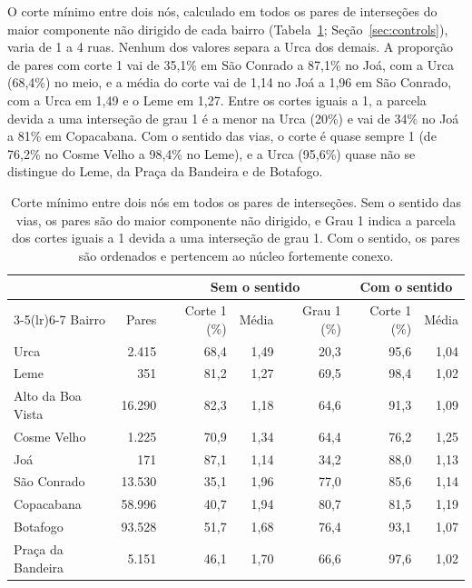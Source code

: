 O corte mínimo entre dois nós, calculado em todos os pares de interseções do
maior componente não dirigido de cada bairro (Tabela~\ref{tab:corte};
Seção~\ref{sec:controls}), varia de 1 a 4 ruas. Nenhum dos valores separa a
Urca dos demais. A proporção de pares com corte 1 vai de 35,1\% em São Conrado
a 87,1\% no Joá, com a Urca (68,4\%) no meio, e a média do corte vai de 1,14 no
Joá a 1,96 em São Conrado, com a Urca em 1,49 e o Leme em 1,27. Entre os cortes
iguais a 1, a parcela devida a uma interseção de grau 1 é a menor na Urca
(20\%) e vai de 34\% no Joá a 81\% em Copacabana. Com o sentido das vias, o
corte é quase sempre 1 (de 76,2\% no Cosme Velho a 98,4\% no Leme), e a Urca
(95,6\%) quase não se distingue do Leme, da Praça da Bandeira e de Botafogo.

\begin{table}[tbp]
\centering
\caption{Corte mínimo entre dois nós em todos os pares de interseções. Sem o
sentido das vias, os pares são do maior componente não dirigido, e Grau 1
indica a parcela dos cortes iguais a 1 devida a uma interseção de grau 1. Com o
sentido, os pares são ordenados e pertencem ao núcleo fortemente conexo.}
\label{tab:corte}
\small
\setlength{\tabcolsep}{3pt}
\begin{tabular}{lrrrrrr}
\toprule
 & & \multicolumn{3}{c}{Sem o sentido} & \multicolumn{2}{c}{Com o sentido} \\
\cmidrule(lr){3-5}\cmidrule(lr){6-7}
Bairro & Pares & Corte 1 (\%) & Média & Grau 1 (\%) & Corte 1 (\%) & Média \\
\midrule
Urca              &  2.415 & 68,4 & 1,49 & 20,3 & 95,6 & 1,04 \\
Leme              &    351 & 81,2 & 1,27 & 69,5 & 98,4 & 1,02 \\
Alto da Boa Vista & 16.290 & 82,3 & 1,18 & 64,6 & 91,3 & 1,09 \\
Cosme Velho       &  1.225 & 70,9 & 1,34 & 64,4 & 76,2 & 1,25 \\
Joá               &    171 & 87,1 & 1,14 & 34,2 & 88,0 & 1,13 \\
São Conrado       & 13.530 & 35,1 & 1,96 & 77,0 & 85,6 & 1,14 \\
Copacabana        & 58.996 & 40,7 & 1,94 & 80,7 & 81,5 & 1,19 \\
Botafogo          & 93.528 & 51,7 & 1,68 & 76,4 & 93,1 & 1,07 \\
Praça da Bandeira &  5.151 & 46,1 & 1,70 & 66,6 & 97,6 & 1,02 \\
\bottomrule
\end{tabular}
\end{table}

